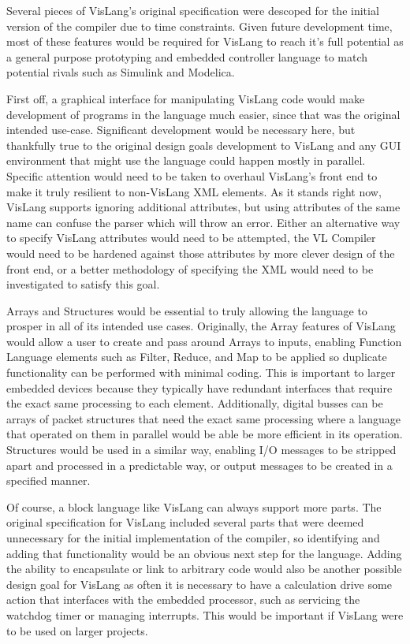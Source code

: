 Several pieces of VisLang's original specification were descoped for the initial version
of the compiler due to time constraints. Given future development time, most of these
features would be required for VisLang to reach it's full potential as a general purpose
prototyping and embedded controller language to match potential rivals such as Simulink
and Modelica.
\par
First off, a graphical interface for manipulating VisLang code would make development of
programs in the language much easier, since that was the original intended use-case.
Significant development would be necessary here, but thankfully true to the original
design goals development to VisLang and any GUI environment that might use the language
could happen mostly in parallel. Specific attention would need to be taken to overhaul
VisLang's front end to make it truly resilient to non-VisLang XML elements. As it stands
right now, VisLang supports ignoring additional attributes, but using attributes of the
same name can confuse the parser which will throw an error. Either an alternative way to
specify VisLang attributes would need to be attempted, the VL Compiler would need to be
hardened against those attributes by more clever design of the front end, or a better
methodology of specifying the XML would need to be investigated to satisfy this goal.
\par
Arrays and Structures would be essential to truly allowing the language to prosper in
all of its intended use cases. Originally, the Array features of VisLang would allow a
user to create and pass around Arrays to inputs, enabling Function Language elements such
as Filter, Reduce, and Map to be applied so duplicate functionality can be performed with
minimal coding. This is important to larger embedded devices because they typically have
redundant interfaces that require the exact same processing to each element. Additionally,
digital busses can be arrays of packet structures that need the exact same processing
where a language that operated on them in parallel would be able be more efficient in its
operation. Structures would be used in a similar way, enabling I/O messages to be stripped
apart and processed in a predictable way, or output messages to be created in a specified
manner.
\par
Of course, a block language like VisLang can always support more parts. The original
specification for VisLang included several parts that were deemed unnecessary for the
initial implementation of the compiler, so identifying and adding that functionality
would be an obvious next step for the language. Adding the ability to encapsulate or link
to arbitrary code would also be another possible design goal for VisLang as often it is
necessary to have a calculation drive some action that interfaces with the embedded
processor, such as servicing the watchdog timer or managing interrupts. This would be
important if VisLang were to be used on larger projects.
